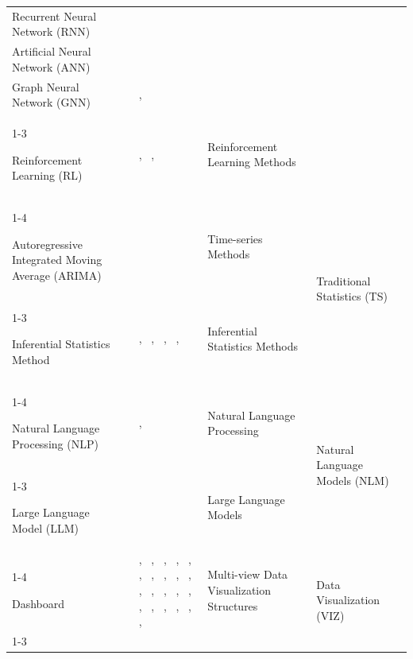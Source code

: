 \documentclass{sfuthesis}
\begin{document}
\begin{appendices}
\begin{landscape}
\begin{longtable}{
p{5.5cm}
p{4cm}
p{6cm}
p{3.5cm}
}
Recurrent Neural Network (RNN) &
~\cite{kim2025development} &
&
\\

Artificial Neural Network (ANN) &
~\cite{Chen2023TyphoonVolunteers} &
&
\\

Graph Neural Network (GNN) &
~\cite{li2024optimal}, ~\cite{price2025aura} &
&
\\
\cline{1-3}

Reinforcement Learning (RL) &
~\cite{krishnan2024data}, ~\cite{miao2025research}, ~\cite{wang2026intelligent} &
Reinforcement Learning Methods &
\\
\cline{1-4}


Autoregressive Integrated Moving Average (ARIMA) &
~\cite{krishnan2024data} &
Time-series Methods &
\multirow{2}{3.5cm}{Traditional Statistics (TS)}
\\
\cline{1-3}

Inferential Statistics Method &
~\cite{cavieres_methodology_2020}, ~\cite{Monti2025RailwayBridgeDSS}, ~\cite{muller2021risk}, ~\cite{sreepathy2023design}, ~\cite{ataei2024intelligent} &
Inferential Statistics Methods &
\\
\cline{1-4}

Natural Language Processing (NLP) &
~\cite{Shapa2021PoultryFarmers}, ~\cite{miao2025construction} &
Natural Language Processing &
\multirow{2}{3.5cm}{Natural Language Models (NLM)}
\\
\cline{1-3}

Large Language Model (LLM) &
~\cite{zhou2026safedrive} &
Large Language Models &
\\
\cline{1-4}

Dashboard &
~\cite{Yang2010MacroeconomicDSS}, ~\cite{Han2020WastewaterDecisionMaking}, ~\cite{krishnan2024data}, ~\cite{DelaCal2026CulturalTourism}, ~\cite{Pahuja2024Dexter}, ~\cite{Dahl2022PathologyLaboratories}, ~\cite{Sheikhkhoshkar2025ConstructionDSS}, ~\cite{Osman2021SmartCities}, ~\cite{song2024building}, ~\cite{gaftandzhieva2023data}, ~\cite{kim2025development}, ~\cite{o20184d}, ~\cite{street2022data}, ~\cite{chorev2017data}, ~\cite{vandewiele2018decision}, ~\cite{sreepathy2023design}, ~\cite{peters2023data}, ~\cite{weiner_integrating_2015}, ~\cite{price2025aura}, ~\cite{lusher2014data}, ~\cite{hansotte2021supporting}, ~\cite{catalano2017using} &
Multi-view Data Visualization Structures &
\multirow{10}{3.5cm}{Data Visualization (VIZ)}
\\
\cline{1-3}


\end{longtable}
\end{landscape}
\end{appendices}
\end{document}
